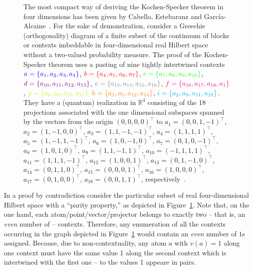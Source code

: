 \documentclass[%
  twocolumn,
 showpacs,
 showkeys,
 preprintnumbers,
 amsmath,amssymb,
 aps,
  pra,
  longbibliography,
 floatfix,
 ]{revtex4-1}
\begin{document}
\begin{figure}
\begin{center}
\begin{tikzpicture}  [scale=0.6]
	\end{tikzpicture}
\end{center}
\caption{
The most compact way of deriving the Kochen-Specker theorem in four dimensions has been given by
Cabello, Estebaranz and Garc{\'{i}}a-Alcaine~\cite{cabello-96,cabello-99}.
For the sake of demonstration, consider a Greechie (orthogonality) diagram of a
finite subset of the continuum of blocks or contexts imbeddable in
four-dimensional real Hilbert space without a two-valued probability measure.
The proof of the Kochen-Specker theorem  uses a pasting of nine tightly intertwined contexts
$\color{blue}a=\{a_1,a_2,a_3,a_4\}$,
$\color{red}b=\{a_4,a_5,a_6,a_7\}$,
$\color{green}c=\{a_7,a_8,a_9,a_{10}\}$,
$\color{violet}d=\{a_{10},a_{11},a_{12},a_{13}\}$,
$\color{gray}e=\{a_{13},a_{14},a_{15},a_{16}\}$,
$\color{magenta}f=\{a_{16},a_{17},a_{18},a_1\}$,
$\color{lime}g=\{a_6,a_8,a_{15},a_{17}\}$
$\color{orange}h=\{a_3,a_5,a_{12},a_{14}\}$,
$\color{cyan}i=\{a_2,a_9,a_{11},a_{18}\}$.
They have a (quantum) realization in $\mathbb{R}^4$
consisting of the 18 projections associated with the one dimensional subspaces spanned by
the vectors from the origin $(0,0,0,0)^\intercal$ to
$a_1=\left(   0,0,1,-1     \right)^\intercal    $,
$a_2=\left(   1,-1,0,0     \right)^\intercal    $,
$a_3=\left(   1,1,-1,-1    \right)^\intercal   $,
$a_4=\left(   1,1,1,1      \right)^\intercal     $,
$a_5=\left(   1,-1,1,-1    \right)^\intercal  $,
$a_6=\left(   1,0,-1,0     \right)^\intercal   $,
$a_7=\left(   0,1,0,-1   \right)^\intercal   $,
$a_8=\left(   1,0,1,0    \right)^\intercal    $,
$a_9=\left(   1,1,-1,1   \right)^\intercal   $,
$a_{10}=\left(-1,1,1,1   \right)^\intercal    $,
$a_{11}=\left(1,1,1,-1   \right)^\intercal    $,
$a_{12}=\left(1,0,0,1    \right)^\intercal     $,
$a_{13}=\left(0,1,-1,0   \right)^\intercal    $,
$a_{14}=\left(0,1,1,0    \right)^\intercal    $,
$a_{15}=\left(0,0,0,1    \right)^\intercal    $,
$a_{16}=\left(1,0,0,0    \right)^\intercal    $,
$a_{17}=\left(0,1,0,0    \right)^\intercal    $,
$a_{18}=\left(0,0,1,1    \right)^\intercal    $,
 respectively~\cite[Fig.~1]{cabello:210401}.
%
\label{2016-pu-book-chapter-qm-f-kspac}
}
\end{figure}

In a proof by contradiction
consider the particular subset of real four-dimensional Hilbert space with a ``parity property,''
as depicted in Figure~\ref{2016-pu-book-chapter-qm-f-kspac}.
Note that, on the one hand,
each atom/point/vector/projector belongs
to exactly two -- that is, an {\em even} number of -- contexts.
Therefore,
any enumeration of  all the contexts occurring in the graph
depicted in Figure~\ref{2016-pu-book-chapter-qm-f-kspac}
would contain an {\em even} number of $1$s assigned.
Because, due to non-contextuality,
any atom $a$ with $v(a)=1$ along one context must have the same value 1 along the second context
which is intertwined with the first one -- to the values 1 appeare in pairs.
\end{document}
